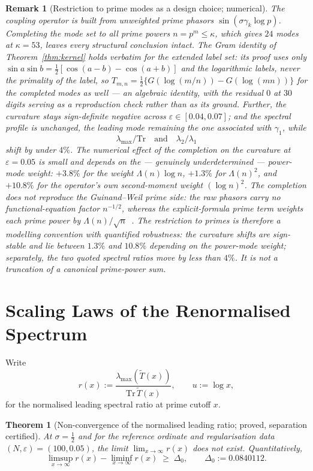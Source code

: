 \documentclass[11pt]{article}
\newtheorem{theorem}{Theorem}[section]
\newtheorem*{remark}{Remark}
\newcommand{\Tt}{\widetilde{T}}
\begin{document}
\begin{remark}[Restriction to prime modes as a design choice; numerical]
\label{rem:lambda}
The coupling operator is built from unweighted prime phasors
$\sin(\sigma\gamma_k\log p)$. Completing the mode set to all prime powers
$n=p^m\le\kappa$, which gives $24$ modes at $\kappa=53$, leaves every
structural conclusion intact. The Gram identity of Theorem~\ref{thm:kernel}
holds verbatim for the extended label set: its proof uses only
$\sin a\sin b=\tfrac12[\cos(a-b)-\cos(a+b)]$ and the logarithmic labels, never
the primality of the label, so
$T_{m,n}=\tfrac12\{G(\log(m/n))-G(\log(mn))\}$ for the completed modes as
well --- an algebraic identity, with the residual $0$ at $30$ digits serving as
a reproduction check rather than as its ground. Further,
the curvature stays sign-definite negative across
$\varepsilon\in[0.04,0.07]$; and the spectral profile is unchanged, the
leading mode remaining the one associated with $\gamma_1$, while
\[
\lambda_{\max}/\mathrm{Tr}\quad\text{and}\quad\lambda_2/\lambda_1
\]
shift by under $4\%$.
The numerical effect of the completion on the curvature at
$\varepsilon=0.05$ is small and depends on the --- genuinely underdetermined
--- power-mode weight: $+3.8\%$ for the weight $\Lambda(n)\log n$, $+1.3\%$
for $\Lambda(n)^2$, and $+10.8\%$ for the operator's own second-moment weight
$(\log n)^2$. The completion does \emph{not} reproduce the Guinand--Weil prime
side: the raw phasors carry no functional-equation factor $n^{-1/2}$, whereas
the explicit-formula prime term weights each prime power by
$\Lambda(n)/\sqrt{n}$~\cite{IwaniecKowalski}. The restriction to primes is therefore a modelling convention with
quantified robustness: the curvature shifts are sign-stable and lie between
$1.3\%$ and $10.8\%$ depending on the power-mode weight; separately, the two
quoted spectral ratios move by less than $4\%$. It is not a truncation of a
canonical prime-power sum.
\end{remark}

\section{Scaling Laws of the Renormalised Spectrum}
\label{sec:scaling}

Write
\[
r(x):=\frac{\lambda_{\max}(\Tt(x))}{\mathrm{Tr}\,\Tt(x)},\qquad u:=\log x,
\]
for the normalised leading spectral ratio at prime cutoff $x$.

\begin{theorem}[Non-convergence of the normalised leading ratio; proved,
separation certified]
\label{thm:nonconv}
At $\sigma=\tfrac12$ and for the reference ordinate and regularisation data
$(N,\varepsilon)=(100,0.05)$, the limit $\lim_{x\to\infty}r(x)$ does not
exist. Quantitatively,
\[
\limsup_{x\to\infty}r(x)-\liminf_{x\to\infty}r(x)\;\ge\;\Delta_0,
\qquad \Delta_0:=0.0840112 .
\]
\end{theorem}
\end{document}
